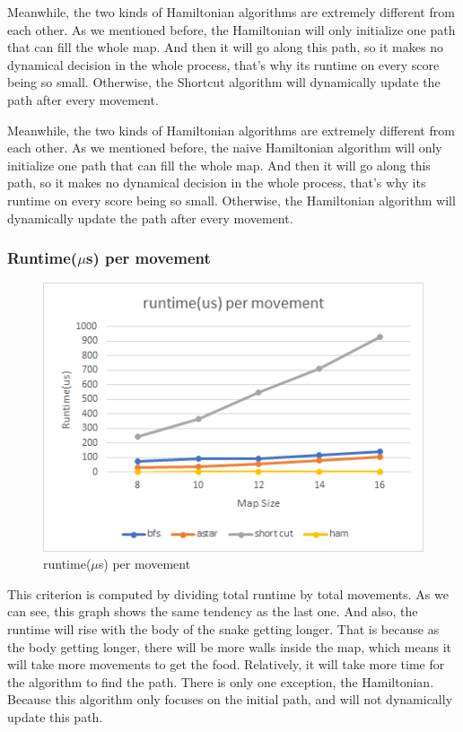 \documentclass[12pt]{article}
\begin{document}
Meanwhile, the two kinds of Hamiltonian algorithms are extremely different from each other. 
As we mentioned before, the Hamiltonian will only initialize one path that can fill the whole map. 
And then it will go along this path, so it makes no dynamical decision in the whole process, 
that's why its runtime on every score being so small. Otherwise, the Shortcut algorithm will 
dynamically update the path after every movement. 


Meanwhile, the two kinds of Hamiltonian algorithms are extremely different from each other. As we mentioned before, the naive Hamiltonian algorithm will only initialize one path that can fill the whole map. And then it will go along this path, so it makes no dynamical decision in the whole process, that's why its runtime on every score being so small. Otherwise, the Hamiltonian algorithm will dynamically update the path after every movement. 

\subsubsection{Runtime($\mu$s) per movement}



\begin{figure}[H]
    \centering 
    \includegraphics[scale = 0.9]{anay3.png}
    \caption{runtime($\mu$s) per movement}
\end{figure}

This criterion is computed by dividing total runtime by total movements. As we can see, 
this graph shows the same tendency as the last one. And also, the runtime will rise with the 
body of the snake getting longer. That is because as the body getting longer, there will be 
more walls inside the map, which means it will take more movements to get the food. Relatively, 
it will take more time for the algorithm to find the path. There is only one exception, 
the Hamiltonian. Because this algorithm only focuses on the initial path, and will not dynamically 
update this path.
\end{document}
